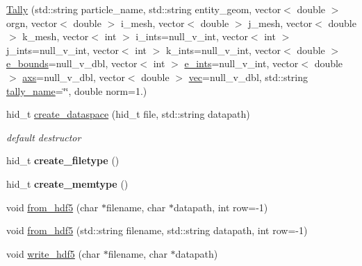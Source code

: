 \begin{DoxyCompactItemize}
\item 
\hyperlink{classpyne_1_1_tally_a25a510296179eef28963a9a746b69ac9}{Tally} (std\+::string particle\+\_\+name, std\+::string entity\+\_\+geom, vector$<$ double $>$ orgn, vector$<$ double $>$ i\+\_\+mesh, vector$<$ double $>$ j\+\_\+mesh, vector$<$ double $>$ k\+\_\+mesh, vector$<$ int $>$ i\+\_\+ints=null\+\_\+v\+\_\+int, vector$<$ int $>$ j\+\_\+ints=null\+\_\+v\+\_\+int, vector$<$ int $>$ k\+\_\+ints=null\+\_\+v\+\_\+int, vector$<$ double $>$ \hyperlink{classpyne_1_1_tally_ab5e705bcd3521bc0946ccb026077197c}{e\+\_\+bounds}=null\+\_\+v\+\_\+dbl, vector$<$ int $>$ \hyperlink{classpyne_1_1_tally_ac92555231fcf5dcea1781831ad902e87}{e\+\_\+ints}=null\+\_\+v\+\_\+int, vector$<$ double $>$ \hyperlink{classpyne_1_1_tally_a883412bf93615a0cf19f0404b5bf6cba}{axs}=null\+\_\+v\+\_\+dbl, vector$<$ double $>$ \hyperlink{classpyne_1_1_tally_af5c2fcb0cec3b5886e4630f5ab6f5dc7}{vec}=null\+\_\+v\+\_\+dbl, std\+::string \hyperlink{classpyne_1_1_tally_af5e75c809e337a06d26636020d3f1809}{tally\+\_\+name}=\char`\"{}\char`\"{}, double norm=1.)
\item 
\mbox{\label{classpyne_1_1_tally_a5a0f19d9948855a18c2e8d10ddb96882}} 
hid\+\_\+t \hyperlink{classpyne_1_1_tally_a5a0f19d9948855a18c2e8d10ddb96882}{create\+\_\+dataspace} (hid\+\_\+t file, std\+::string datapath)
\begin{DoxyCompactList}\small\item\em default destructor \end{DoxyCompactList}\item 
\mbox{\label{classpyne_1_1_tally_affa61772b8a520ac428bdda9a262473b}} 
hid\+\_\+t {\bfseries create\+\_\+filetype} ()
\item 
\mbox{\label{classpyne_1_1_tally_a8fcd447da4e33f35ecd893284dee4bd6}} 
hid\+\_\+t {\bfseries create\+\_\+memtype} ()
\item 
void \hyperlink{classpyne_1_1_tally_a35a1d7e9e2b982df18f5f54e69c27e67}{from\+\_\+hdf5} (char $\ast$filename, char $\ast$datapath, int row=-\/1)
\item 
void \hyperlink{classpyne_1_1_tally_a4386d5c391675c4f079f18c8775d4a9a}{from\+\_\+hdf5} (std\+::string filename, std\+::string datapath, int row=-\/1)
\item 
void \hyperlink{classpyne_1_1_tally_a26dbc6f9410d9bdd1e780338ec4551b2}{write\+\_\+hdf5} (char $\ast$filename, char $\ast$datapath)

\end{DoxyCompactItemize}
